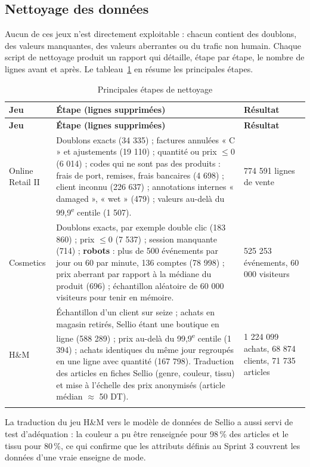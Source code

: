 \subsection{Nettoyage des données}
Aucun de ces jeux n'est directement exploitable : chacun contient des doublons, des valeurs manquantes, des valeurs aberrantes ou du trafic non humain. Chaque script de nettoyage produit un rapport qui détaille, étape par étape, le nombre de lignes avant et après. Le tableau~\ref{tab:nettoyage} en résume les principales étapes.

\renewcommand{\arraystretch}{1.3}
\begin{longtable}{|p{2.6cm}|p{8.6cm}|p{3.4cm}|}
\hline
\textbf{Jeu} & \textbf{Étape (lignes supprimées)} & \textbf{Résultat} \\
\hline
\endfirsthead
\hline
\textbf{Jeu} & \textbf{Étape (lignes supprimées)} & \textbf{Résultat} \\
\hline
\endhead
Online Retail II &
Doublons exacts (34 335) ; factures annulées « C » et ajustements (19 110) ; quantité ou prix $\le 0$ (6 014) ; codes qui ne sont pas des produits : frais de port, remises, frais bancaires (4 698) ; client inconnu (226 637) ; annotations internes « damaged », « wet » (479) ; valeurs au-delà du 99,9\textsuperscript{e} centile (1 507). &
774 591 lignes de vente \\
\hline
Cosmetics &
Doublons exacts, par exemple double clic (183 860) ; prix $\le 0$ (7 537) ; session manquante (714) ; \textbf{robots} : plus de 500 événements par jour ou 60 par minute, 136 comptes (78 998) ; prix aberrant par rapport à la médiane du produit (696) ; échantillon aléatoire de 60 000 visiteurs pour tenir en mémoire. &
525 253 événements, 60 000 visiteurs \\
\hline
H\&M &
Échantillon d'un client sur seize ; achats en magasin retirés, Sellio étant une boutique en ligne (588 289) ; prix au-delà du 99,9\textsuperscript{e} centile (1 394) ; achats identiques du même jour regroupés en une ligne avec quantité (167 798). Traduction des articles en fiches Sellio (genre, couleur, tissu) et mise à l'échelle des prix anonymisés (article médian $\approx$ 50 DT). &
1 224 099 achats, 68 874 clients, 71 735 articles \\
\hline
\caption{Principales étapes de nettoyage}
\label{tab:nettoyage}
\end{longtable}

La traduction du jeu H\&M vers le modèle de données de Sellio a aussi servi de test d'adéquation : la couleur a pu être renseignée pour 98\,\% des articles et le tissu pour 80\,\%, ce qui confirme que les attributs définis au Sprint 3 couvrent les données d'une vraie enseigne de mode.


